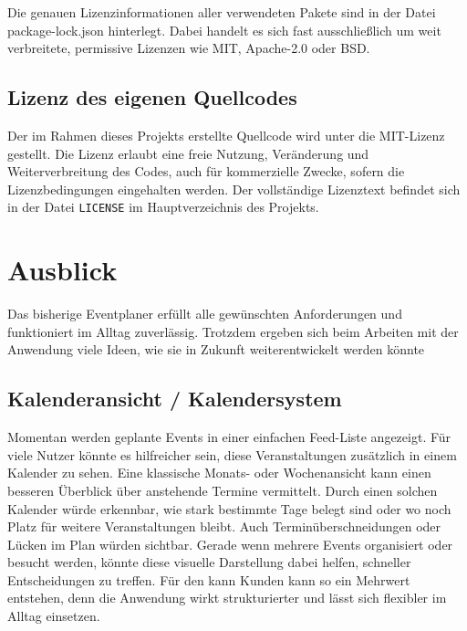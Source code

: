 \documentclass[a4paper,12pt]{article}
\begin{document}
Die genauen Lizenzinformationen aller verwendeten Pakete sind in der Datei package-lock.json hinterlegt. Dabei handelt es sich fast ausschließlich um weit verbreitete, permissive Lizenzen wie MIT, Apache-2.0 oder BSD.

\subsection{Lizenz des eigenen Quellcodes}

Der im Rahmen dieses Projekts erstellte Quellcode wird unter die MIT-Lizenz gestellt. Die Lizenz erlaubt eine freie Nutzung, Veränderung und Weiterverbreitung des Codes, auch für kommerzielle Zwecke, sofern die Lizenzbedingungen eingehalten werden. Der vollständige Lizenztext befindet sich in der Datei \texttt{LICENSE} im Hauptverzeichnis des Projekts.


\newpage


\section{Ausblick}

Das bisherige Eventplaner erfüllt alle gewünschten Anforderungen und funktioniert im Alltag zuverlässig. Trotzdem ergeben sich beim Arbeiten mit der Anwendung viele Ideen, wie sie in Zukunft weiterentwickelt werden könnte


\subsection{Kalenderansicht / Kalendersystem}

Momentan werden geplante Events in einer einfachen Feed-Liste angezeigt. Für viele Nutzer könnte es hilfreicher sein, diese Veranstaltungen zusätzlich in einem Kalender zu sehen. Eine klassische Monats- oder Wochenansicht kann einen besseren Überblick über anstehende Termine vermittelt. Durch einen solchen Kalender würde erkennbar, wie stark bestimmte Tage belegt sind oder wo noch Platz für weitere Veranstaltungen bleibt. Auch Terminüberschneidungen oder Lücken im Plan würden sichtbar. Gerade wenn mehrere Events organisiert oder besucht werden, könnte diese visuelle Darstellung dabei helfen, schneller Entscheidungen zu treffen. Für den kann Kunden kann so ein Mehrwert entstehen, denn die Anwendung wirkt strukturierter und lässt sich flexibler im Alltag einsetzen.
\end{document}
